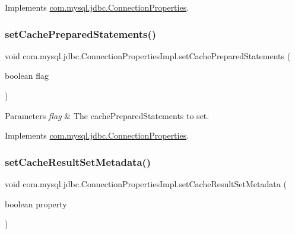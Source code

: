 Implements \mbox{\hyperlink{interfacecom_1_1mysql_1_1jdbc_1_1_connection_properties_ae88f31bc280f1a82f70847797a0a25e7}{com.\+mysql.\+jdbc.\+Connection\+Properties}}.

\mbox{\label{classcom_1_1mysql_1_1jdbc_1_1_connection_properties_impl_a735b9ad315c67ef52c1e968613d2429f}} 
\subsubsection{\texorpdfstring{set\+Cache\+Prepared\+Statements()}{setCachePreparedStatements()}}
{\footnotesize\ttfamily void com.\+mysql.\+jdbc.\+Connection\+Properties\+Impl.\+set\+Cache\+Prepared\+Statements (\begin{DoxyParamCaption}\item[{boolean}]{flag }\end{DoxyParamCaption})}


\begin{DoxyParams}{Parameters}
{\em flag} & The cache\+Prepared\+Statements to set. \\
\hline
\end{DoxyParams}


Implements \mbox{\hyperlink{interfacecom_1_1mysql_1_1jdbc_1_1_connection_properties_a990fe5790551ed49878ecc8bceb750a5}{com.\+mysql.\+jdbc.\+Connection\+Properties}}.

\mbox{\label{classcom_1_1mysql_1_1jdbc_1_1_connection_properties_impl_ae60b4c7199487d2b0b76cbb340bf9c55}} 
\subsubsection{\texorpdfstring{set\+Cache\+Result\+Set\+Metadata()}{setCacheResultSetMetadata()}}
{\footnotesize\ttfamily void com.\+mysql.\+jdbc.\+Connection\+Properties\+Impl.\+set\+Cache\+Result\+Set\+Metadata (\begin{DoxyParamCaption}\item[{boolean}]{property }\end{DoxyParamCaption})}

